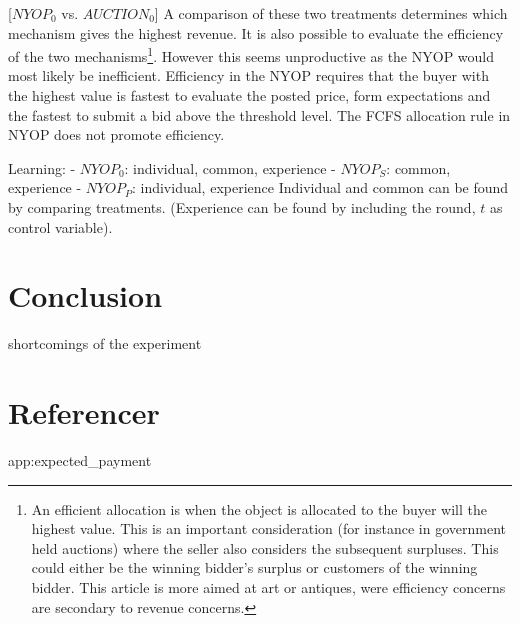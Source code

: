 \documentclass[a4paper,12pt]{article}
\begin{document}
	[$NYOP_0$ vs. $AUCTION_0$]
	A comparison of these two treatments determines which mechanism gives the highest revenue. It is also possible to evaluate the efficiency of the two mechanisms\footnote{\label{footnote:efficient}An efficient allocation is when the object is allocated to the buyer will the highest value. This is an important consideration (for instance in government held auctions) where the seller also considers the subsequent surpluses. This could either be the winning bidder's surplus or customers of the winning bidder. This article is more aimed at art or antiques, were efficiency concerns are secondary to revenue concerns.}. However this seems unproductive as the NYOP would most likely be inefficient. Efficiency in the NYOP requires that the buyer with the highest value is fastest to evaluate the posted price, form expectations and the fastest to submit a bid above the threshold level. The FCFS allocation rule in NYOP does not promote efficiency. 
	
	Learning: 
	- $NYOP_0$: individual, common, experience
	- $NYOP_S$: common, experience
	- $NYOP_P$: individual, experience
	Individual and common can be found by comparing treatments. (Experience can be found by including the round, $t$ as control variable).
	
	\section{Conclusion}
			
	shortcomings of the experiment
			
	\newpage
	\appendix
	
	\begingroup
		\section{Referencer}
		
		\nocite{*}
		\renewcommand{\section}[2]{}%
		\raggedright
		
%
%
	\endgroup
	
	\section{Expected payments}
	\label{app:expected_payment}
	
\end{document}
